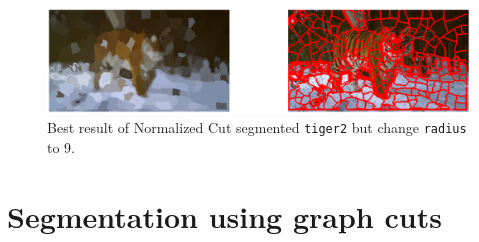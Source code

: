 \documentclass[11pt,a4paper]{article}
\begin{document}
\begin{itemize}
		\begin{figure}[!ht]
			\centering
			\includegraphics[width=\columnwidth]{Figure/Normalizedcut_Tiger2_Best_Result_Radius_9.eps}
			\caption{Best result of Normalized Cut segmented \texttt{tiger2} but change \texttt{radius} to 9.}
			\label{fig:Normalizedcut_Tiger2_Best_Result_Radius_9}
		\end{figure}
\end{itemize}

\section{Segmentation using graph cuts}
\end{document}

